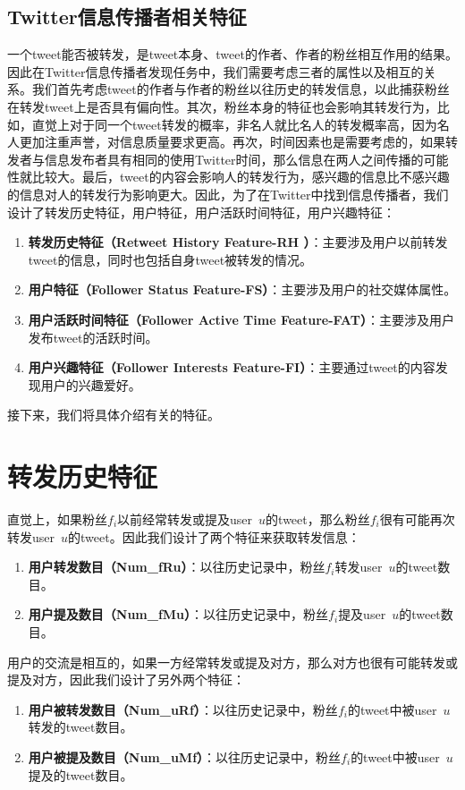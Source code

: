  \subsection{Twitter信息传播者相关特征}
 一个tweet能否被转发，是tweet本身、tweet的作者、作者的粉丝相互作用的结果。因此在Twitter信息传播者发现任务中，我们需要考虑三者的属性以及相互的关系。我们首先考虑tweet的作者与作者的粉丝以往历史的转发信息，以此捕获粉丝在转发tweet上是否具有偏向性。其次，粉丝本身的特征也会影响其转发行为，比如，直觉上对于同一个tweet转发的概率，非名人就比名人的转发概率高，因为名人更加注重声誉，对信息质量要求更高。再次，时间因素也是需要考虑的，如果转发者与信息发布者具有相同的使用Twitter时间，那么信息在两人之间传播的可能性就比较大。最后，tweet的内容会影响人的转发行为，感兴趣的信息比不感兴趣的信息对人的转发行为影响更大。因此，为了在Twitter中找到信息传播者，我们设计了转发历史特征，用户特征，用户活跃时间特征，用户兴趣特征：
 
  \begin{enumerate}
\item{\textbf{转发历史特征（Retweet History Feature-RH ）}}：主要涉及用户以前转发tweet的信息，同时也包括自身tweet被转发的情况。
\item{\textbf{用户特征（Follower Status Feature-FS）}}：主要涉及用户的社交媒体属性。
\item{\textbf{用户活跃时间特征（Follower Active Time Feature-FAT）}}：主要涉及用户发布tweet的活跃时间。
\item{\textbf{用户兴趣特征（Follower Interests Feature-FI）}}：主要通过tweet的内容发现用户的兴趣爱好。
\end{enumerate}
接下来，我们将具体介绍有关的特征。

\section{转发历史特征}
直觉上，如果粉丝$f_i$以前经常转发或提及user~$u$的tweet，那么粉丝$f_i$很有可能再次转发user~$u$的tweet。因此我们设计了两个特征来获取转发信息：
  \begin{enumerate}
\item{\textbf{用户转发数目（Num\_fRu）}}：以往历史记录中，粉丝$f_i$转发user~$u$的tweet数目。
\item{\textbf{用户提及数目（Num\_fMu）}}：以往历史记录中，粉丝$f_i$提及user~$u$的tweet数目。
\end{enumerate}

用户的交流是相互的，如果一方经常转发或提及对方，那么对方也很有可能转发或提及对方，因此我们设计了另外两个特征：
  \begin{enumerate}
\item{\textbf{用户被转发数目（Num\_uRf）}}：以往历史记录中，粉丝$f_i$的tweet中被user~$u$转发的tweet数目。
\item{\textbf{用户被提及数目（Num\_uMf）}}：以往历史记录中，粉丝$f_i$的tweet中被user~$u$提及的tweet数目。
\end{enumerate}

